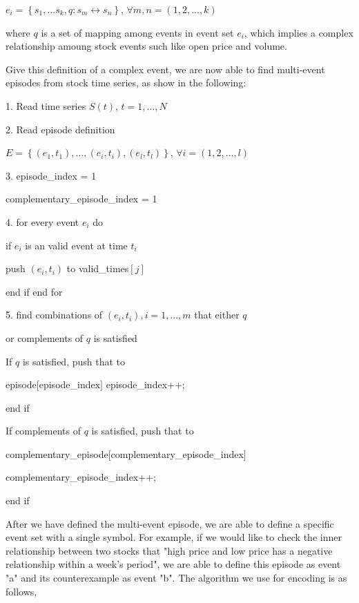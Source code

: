 \documentclass[10pt, conference, compsocconf]{IEEEtran}
\begin{document}
$e_{i}=\left \{ s_{1},...s_{k},q:s_{m}\leftrightarrow s_{n} \right \}$, $\forall m,n=(1,2,...,k)$
\par
where $q$ is a set of mapping among events in event set $e_{i}$, which implies a complex relationship amoung stock events such like open price and volume.
\par
Give this definition of a complex event, we are now able to find multi-event episodes from stock time series, as show in the following:
\vspace{1.2mm}
\par
1. Read time series $S\left ( t \right )$, $t=1,...,N$
\par
2. Read episode definition 
\par\quad $E=\left \{ (e_{1},t_{1}),...,(e_{i},t_{i}),(e_{l},t_{l}) \right \}$, $\forall i=(1,2,...,l)$
\par
3. episode\_index = 1
\par\quad complementary\_episode\_index = 1
\par
4. for every event $e_{i}$ do
\par\quad if $e_{i}$ is an valid event at time $t_{i}$
\par\quad push $(e_{i},t_{i})$ to valid\_times$\left [ j \right ]$
\par\quad end if  end for
\par
5. find combinations of $(e_{i},t_{i}), i=1,...,m$ that either $q$ 
\par\quad or complements of $q$ is satisfied
\par\quad If $q$ is satisfied, push that to 
\par\quad episode$[$episode\_index$]$ episode\_index++;
\par\quad end if
\par\quad If complements of $q$ is satisfied, push that to 
\par\quad complementary\_episode$[$complementary\_episode\_index$]$
\par\quad complementary\_episode\_index++;
\par\quad end if
\vspace{1.2mm}
\par
After we have defined the multi-event episode, we are able to define a specific event set with a single symbol. For example, if we would like to check the inner relationship between two stocks that "high price and low price has a negative relationship
within a week's period", we are able to define this episode as event "a" and its counterexample as event "b". The algorithm we use for encoding is as follows,
\end{document}
